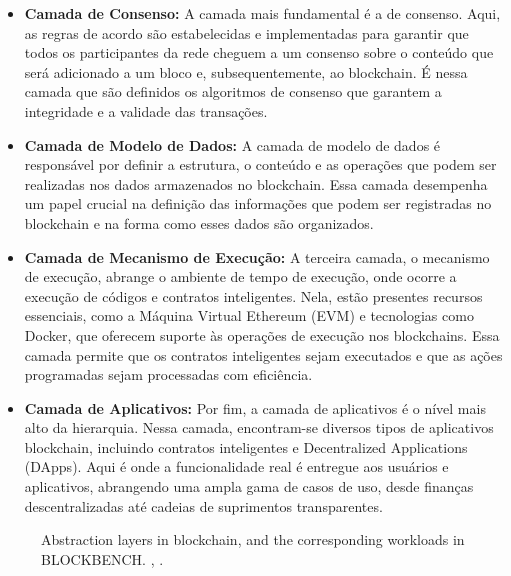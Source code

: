 \begin{itemize}[label=$\blacksquare$]
\item \textbf{Camada de Consenso:} A camada mais fundamental é a de consenso. Aqui, as regras de acordo são estabelecidas e implementadas para garantir que todos os participantes da rede cheguem a um consenso sobre o conteúdo que será adicionado a um bloco e, subsequentemente, ao blockchain. É nessa camada que são definidos os algoritmos de consenso que garantem a integridade e a validade das transações.

\item \textbf{Camada de Modelo de Dados:} A camada de modelo de dados é responsável por definir a estrutura, o conteúdo e as operações que podem ser realizadas nos dados armazenados no blockchain. Essa camada desempenha um papel crucial na definição das informações que podem ser registradas no blockchain e na forma como esses dados são organizados.

\item \textbf{Camada de Mecanismo de Execução:} A terceira camada, o mecanismo de execução, abrange o ambiente de tempo de execução, onde ocorre a execução de códigos e contratos inteligentes. Nela, estão presentes recursos essenciais, como a Máquina Virtual Ethereum (EVM) e tecnologias como Docker, que oferecem suporte às operações de execução nos blockchains. Essa camada permite que os contratos inteligentes sejam executados e que as ações programadas sejam processadas com eficiência.

\item \textbf{Camada de Aplicativos:} Por fim, a camada de aplicativos é o nível mais alto da hierarquia. Nessa camada, encontram-se diversos tipos de aplicativos blockchain, incluindo contratos inteligentes e Decentralized Applications (DApps). Aqui é onde a funcionalidade real é entregue aos usuários e aplicativos, abrangendo uma ampla gama de casos de uso, desde finanças descentralizadas até cadeias de suprimentos transparentes.

\end{itemize}

        \begin{figure}[H]
            \centering
            \caption{Abstraction layers in blockchain, and the corresponding workloads in BLOCKBENCH. \cite{blockbench}, .}
            \label{BlockBench-Layers}
        \end{figure}

